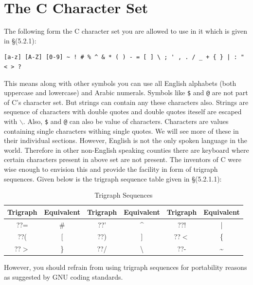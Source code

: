 \section{The C Character Set}
The following form the C character set you are allowed to use in it which is
given in \S(5.2.1):

\begin{Verbatim}[frame=single]
[a-z] [A-Z] [0-9] ~ ! # % ^ & * ( ) - = [ ] \ ; ' , . / _ + { } | : " < > ?
\end{Verbatim}

This means along with other symbols you can use all English alphabets (both
uppercase and lowercase) and Arabic numerals. Symbols like \texttt{\$} and
\texttt{@} are not part of C's character set. But strings can contain any
these characters also. Strings are sequence of characters with double quotes
and double quotes iteself are escaped with \texttt{$\backslash$}. Also,
\texttt{\$} and \texttt{@} can also be value of characters. Characters are
values containing single characters withing single quotes. We will see more of
these in their individual sections. However, English is not the only
spoken language in the world. Therefore in other non-English speaking counties
there are keyboard where certain characters present in above set are not
present. The inventors of C were wise enough to envision this and provide the
facility in form of trigraph sequences. Given below is the trigraph sequence
table given in \S(5.2.1.1):

\begin{table}[H]
 \begin{center}
 \caption{Trigraph Sequences}
\begin{tabular}{|c|c|c|c|c|c|}
\hline
\textbf{Trigraph}&\textbf{Equivalent}&\textbf{Trigraph}&\textbf{Equivalent}&\textbf{Trigraph}&\textbf{Equivalent}\\
\hline
??=&\#&??'&\textasciicircum&??!&|\\
\hline
??(&[&??)&]&??$<$&\{\\
\hline
??$>$&\}&??/&\textbackslash&??-&\textasciitilde\\
\hline
\end{tabular}
\end{center}
\end{table}

However, you should refrain from using trigraph sequences for portability 
reasons as suggested by GNU coding standards.

